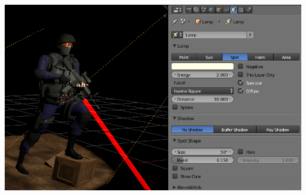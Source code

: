 \documentclass[a4paper,12pt,oneside]{sphinxmanual}
\begin{document}
{\hfill\includegraphics[width=1.000\linewidth]{lighting_setup.jpg}\hfill}
\end{document}
